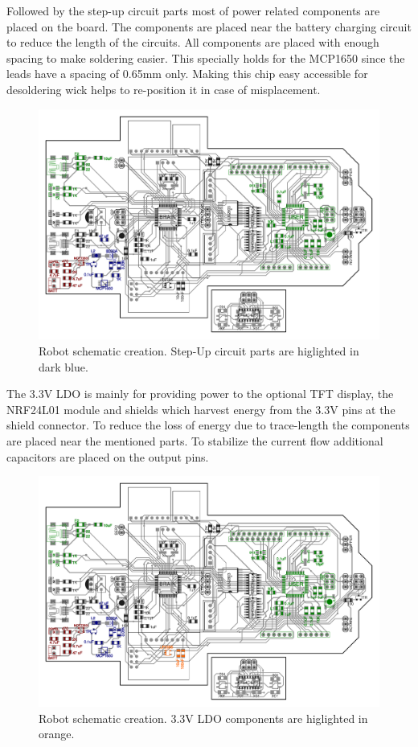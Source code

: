 Followed by the step-up circuit parts most of power related components are placed on the board. The components are placed near the battery charging circuit to reduce the length of the circuits. All components are placed with enough spacing to make soldering easier. This specially holds for the MCP1650 since the leads have a spacing of 0.65mm only. Making this chip easy accessible for desoldering wick helps to re-position it in case of misplacement. 

\begin{figure}[H]
  \centering
  \includegraphics[width=\textwidth]{images/schematic/robot_schematic_stepup.pdf}
  \caption{Robot schematic creation. Step-Up circuit parts are higlighted in dark blue.}
\end{figure}

The 3.3V LDO is mainly for providing power to the optional TFT display, the NRF24L01 module and shields which harvest energy from the 3.3V pins at the shield connector. To reduce the loss of energy due to trace-length the components are placed near the mentioned parts. To stabilize the current flow additional capacitors are placed on the output pins. 

\begin{figure}[H]
  \centering
  \includegraphics[width=\textwidth]{images/schematic/robot_schematic_3_3v.pdf}
  \caption{Robot schematic creation. 3.3V LDO components are higlighted in orange.}
\end{figure}

